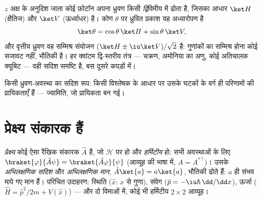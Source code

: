 \begin{example}[फ़ोटॉन का ध्रुवण: एक द्विविमीय संसार]\label{ex:b3:quantum-formalism:polarization}
$z$ अक्ष के अनुदिश जाता कोई फ़ोटॉन अपना ध्रुवण किसी
\emph{द्वि}विमीय  में ढोता है, जिसका आधार $\ket H$
(क्षैतिज) और $\ket V$ (ऊर्ध्वाधर) है। कोण
$\theta$ पर ध्रुवित प्रकाश यह अध्यारोपण है
\[
\ket\theta = \cos\theta\,\ket H + \sin\theta\,\ket V ,
\]
और वृत्तीय ध्रुवण वह सम्मिश्र संयोजन $(\ket H \pm
\iu\ket V)/\sqrt2$ है: गुणांकों का सम्मिश्र होना कोई सजावट नहीं,
भौतिकी है। हर क्वांटम द्वि-स्तरीय तंत्र --- चक्रण, अमोनिया का
अणु, कोई अतिचालक क्यूबिट --- वही सदिश समष्टि है, बस दूसरे कपड़ों में।
\end{example}

\begin{omfigure}

{\small किसी ध्रुवण-अवस्था का सदिश रूप: किसी विश्लेषक के आधार पर उसके
घटकों के वर्ग ही परिणामों की प्रायिकताएँ हैं --- ज्यामिति, जो
प्रायिकता बन गई।}
\end{omfigure}

\section{प्रेक्ष्य संकारक हैं}

\begin{definition}[प्रेक्ष्य]\label{def:b3:quantum-formalism:observable}
\emph{प्रेक्ष्य} कोई ऐसा रैखिक संकारक $\hat A$ है, जो $\mathcal H$ पर
हो और \emph{हर्मिटीय} हो: सभी अवस्थाओं के लिए $\braket{\varphi}{\hat A\psi} =
\braket{\hat A\varphi}{\psi}$ (आव्यूह की भाषा में,
$A = A^{*\top}$)। उसके \emph{अभिलक्षणिक सदिश} और \emph{अभिलक्षणिक मान},
$\hat A\ket{a} = a\ket{a}$, भौतिकी ढोते हैं: $a$ ही संभव मापे गए मान
हैं। परिचित उदाहरण: स्थिति ($\hat x$:
$x$ से गुणा), संवेग ($\hat p = -\iu\hbar\,\dd/\dd x$),
ऊर्जा ($\hat H = \hat p^2/2m + V(\hat x)$) --- और दो
विमाओं में, कोई भी हर्मिटीय $2\times2$ आव्यूह।
\end{definition}

